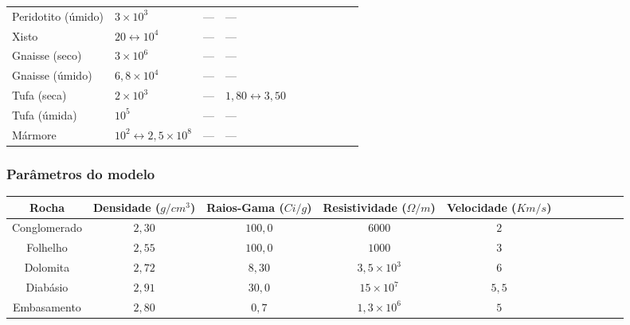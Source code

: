 \documentclass[10pt]{beamer} %
\begin{document}
\begin{frame}
\begin{scriptsize}
\begin{table}[H]
\begin{tabular}{@{}llllllllll@{}}
				Peridotito (úmido) &    $3\times10^{3}$       &      ---         &      ---      &  \\
				Xisto &    $20\leftrightarrow10^{4}$       &        ---       &       ---     &   \\
				Gnaisse (seco) & $3\times10^{6}$          &         ---      &     ---       &   \\
				Gnaisse (úmido) &   $6,8\times10^{4}$        &       ---        &      ---      &   \\
				Tufa (seca) &      $2\times10^{3}$     &      ---         &     $1,80\leftrightarrow3,50$       &     \\
				Tufa (úmida) &     $10^{5}$      &     ---          &     ---       &      \\
				Mármore &  $10^{2}\leftrightarrow2,5\times10^{8}$         &       ---        &      ---      &    \\ \bottomrule
			\end{tabular}
		\end{table}
	\end{scriptsize}
\end{frame}

\begin{frame}
	\frametitle{Parâmetros do modelo}
	\begin{scriptsize}
		\begin{table}[H]
			\centering
			\label{parametros}
			\begin{tabular}{@{}ccccccccccc@{}}
				\toprule
				Rocha        & Densidade ($g/cm^{3}$) & Raios-Gama ($Ci/g$) & Resistividade ($\Omega/m$)&  Velocidade ($Km/s$) &\\ \midrule
				Conglomerado &       $2,30$ 		  &       $100,0$       &           $6000$           &			$2$   		   	&\\
				Folhelho 	 &       $2,55$           &       $100,0$       &           $1000$           &     		$3$		 &\\
				Dolomita     &       $2,72$           &       $8,30$        &           $3,5 \times 10^{3}$           &  	$6$    			 &\\
				Diabásio     &       $2,91$           &       $30,0$        &           $15 \times 10^{7}$           &      $5,5$				 &\\
				Embasamento  &       $2,80$           &       $0,7$         &           $1,3 \times 10^{6}$           & 		$5$		     &\\ \bottomrule
			\end{tabular}
		\end{table}
	\end{scriptsize}
	
\end{frame}
\end{document}
